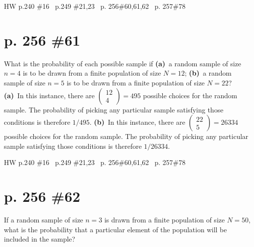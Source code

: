 \documentclass[12pt]{article}
\begin{document}
	\maketitle HW p.240 \#16 \ p.249 \#21,23 \ p. 256\#60,61,62 \ p. 257\#78
	\section[20pt]{p. 256 \#61}
	What is the probability of each possible sample if \newline
	\textbf{(a)}\ a random sample of size \(n=4\) is to be drawn from a finite population of size \(N=12\);
	\newline
	\textbf{(b)}\ a random sample of size \(n=5\) is to be drawn from a finite population of size \(N=22\)?
	\newline
	\newline
	\textbf{(a)}\ In this instance, there are \(\left(\begin{matrix}
	12\\4
\end{matrix}\right)=495\) possible choices for the random sample.
The probability of picking any particular sample satisfying those conditions is therefore \(1/495\).
\newline
{}
\newline
\newline
\textbf{(b)}\ In this instance, there are \(\left(\begin{matrix}
22\\5
\end{matrix}\right)=26334\) possible choices for the random sample.
The probability of picking any particular sample satisfying those conditions is therefore \(1/26334\).
\newline
{}
\newline
\newpage

\maketitle HW p.240 \#16 \ p.249 \#21,23 \ p. 256\#60,61,62 \ p. 257\#78
\section[20pt]{p. 256 \#62}
If a random sample of size \(n = 3\) is drawn from a finite population of size \(N = 50\), what is the probability that a particular element of the population will be included in the sample?
\newline \newline
{}
\newpage
\end{document}
